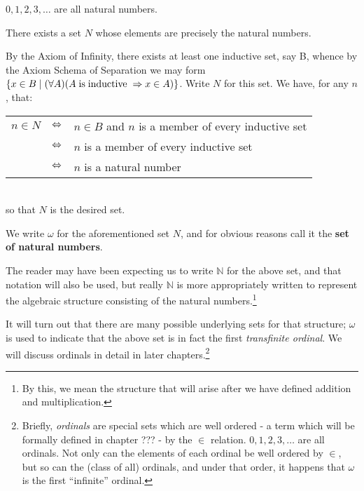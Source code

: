 \begin{example} 
\label{Xmpl:_Natural_Numbers_are_Natural_Numbers} $0, 1, 2, 3, \dots$ are all natural numbers.
\end{example}

\begin{thm}
\label{Thm:_Set_of_Natural_Numbers_Exists}
There exists a set $N$ whose elements are precisely the natural numbers.
\end{thm}

\begin{prf}
By the Axiom of Infinity, there exists at least one inductive set, say B, whence by the Axiom Schema of Separation we may form $\{x\in B\mid (\forall A)(A \mathrm{\; is \; inductive \;} \Rightarrow x\in A)\}$. Write $N$ for this set. We have, for any $n$, that: \\

\begin{tabular}{lll}
 $n\in N$ & $\Leftrightarrow$ & $n\in B$ and $n$ is a member of every inductive set\\ 
  & $\Leftrightarrow$ & $n$ is a member of every inductive set \\ 
  & $\Leftrightarrow$ & $n$ is a natural number \\
\end{tabular} \\

so that $N$ is the desired set.
\end{prf}

\begin{defn}
\label{Defn:_omega}
We write $\omega$ for the aforementioned set $N$, and for obvious reasons call it the \textbf{set of natural numbers}. 
\end{defn}

The reader may have been expecting us to write $\mathbb{N}$ for the above set, and that notation will also be used, but really $\mathbb{N}$ is more appropriately written to represent the algebraic structure consisting of the natural numbers.\footnote{By this, we mean the structure that will arise after we have defined addition and multiplication.} 

It will turn out that there are many possible underlying sets for that structure; $\omega$ is used to indicate that the above set is in fact the first \emph{transfinite ordinal}. We will discuss ordinals in detail in later chapters.\footnote{Briefly, \emph{ordinals} are special sets which are well ordered - a term which will be formally defined in chapter ??? - by the $\in$ relation. $0, 1, 2, 3, \dots$ are all ordinals. Not only can the elements of each ordinal be well ordered by $\in$, but so can the (class of all) ordinals, and under that order, it happens that $\omega$ is the first \enquote{infinite} ordinal.}

